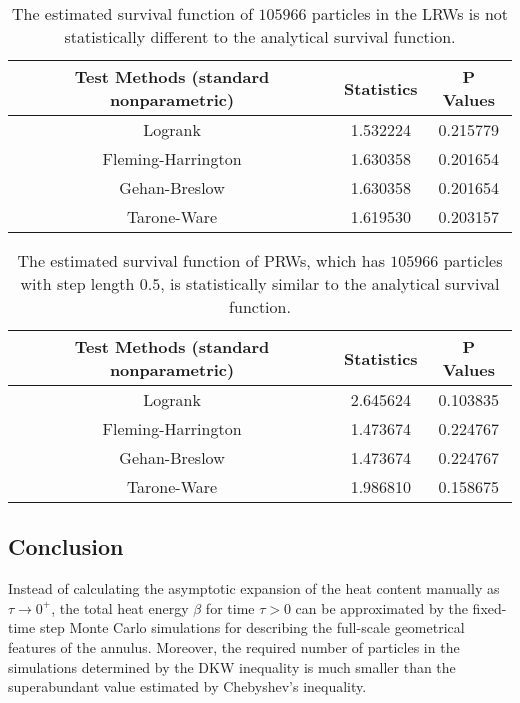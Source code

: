 \clearpage


\begin{table}[h!]
  \centering
  \begin{tabular}{|c|c|c|}\hline
    Test Methods (standard nonparametric) & Statistics & P Values \\
    \hline
    Logrank & 1.532224 & 0.215779 \\
    \hline
    Fleming-Harrington & 1.630358 & 0.201654 \\
    \hline
    Gehan-Breslow & 1.630358 & 0.201654 \\
    \hline
    Tarone-Ware & 1.619530 & 0.203157 \\
    \hline
  \end{tabular}
  \caption{The estimated survival function of $105966$ particles in
    the LRWs is not statistically different to the analytical survival
    function. }
\end{table}


\begin{table}[h!]
  \centering
  \begin{tabular}{|c|c|c|}\hline
    Test Methods (standard nonparametric) & Statistics & P Values \\
    \hline
    Logrank & 2.645624 & 0.103835 \\
    \hline
    Fleming-Harrington & 1.473674 & 0.224767 \\
    \hline
    Gehan-Breslow & 1.473674 & 0.224767 \\
    \hline
    Tarone-Ware & 1.986810 & 0.158675 \\
    \hline
  \end{tabular}
  \caption{The estimated survival function of PRWs, which has
    $105966$ particles with step length $0.5$, is statistically
    similar to the analytical survival function.}
\end{table}


\subsection{Conclusion}


Instead of calculating the asymptotic expansion of the heat content
manually as $\tau \rightarrow 0^+$, the total heat energy $\beta$
\cite{gilkey1994heat} for time $\tau > 0$ can be approximated by the
fixed-time step Monte Carlo simulations for describing the full-scale
geometrical features of the annulus. Moreover, the required number of
particles in the simulations determined by the DKW inequality is much
smaller than the superabundant value estimated by Chebyshev’s
inequality. 
